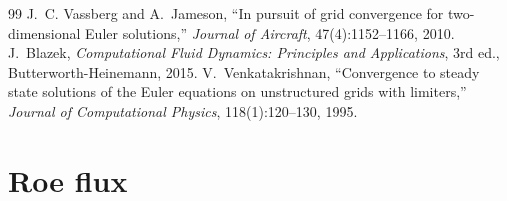 \documentclass[12pt,a4paper]{article}
\begin{document}
\clearpage
{}
{}
\begin{thebibliography}{99}
 J.~C. Vassberg and A.~Jameson, ``In pursuit of grid convergence for two-dimensional Euler solutions,''
  \emph{Journal of Aircraft}, 47(4):1152--1166, 2010.
 J.~Blazek, \emph{Computational Fluid Dynamics: Principles and Applications}, 3rd ed.,
  Butterworth-Heinemann, 2015.
 V.~Venkatakrishnan, ``Convergence to steady state solutions of the Euler equations on
  unstructured grids with limiters,'' \emph{Journal of Computational Physics}, 118(1):120--130, 1995.
\end{thebibliography}

\appendix

\clearpage
\section{Roe flux}\label{app:roe}
\end{document}
